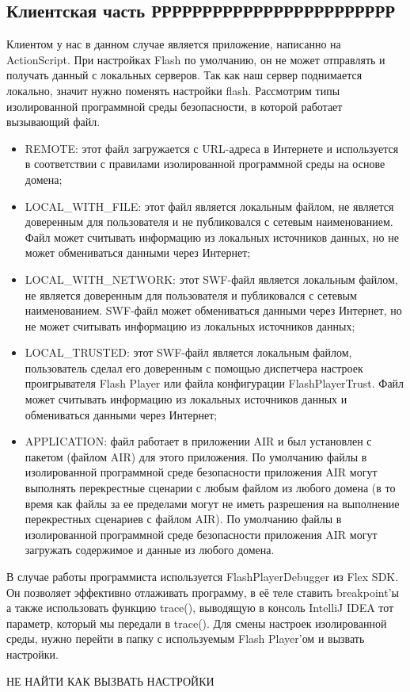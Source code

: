\subsection{Клиентская часть РРРРРРРРРРРРРРРРРРРРРРРР}
Клиентом у нас в данном случае является приложение, написанно на ActionScript. При настройках Flash по умолчанию, он не может отправлять и получать данный с локальных серверов. Так как наш сервер поднимается локально, значит нужно поменять настройки flash. Рассмотрим типы изолированной программной среды безопасности, в которой работает вызывающий файл.
\begin{itemize}
  \item REMOTE: этот файл загружается с URL-адреса в Интернете и используется в соответствии с правилами изолированной программной среды на основе домена;
  \item LOCAL\_WITH\_FILE: этот файл является локальным файлом, не является доверенным для пользователя и не публиковался с сетевым наименованием. Файл может считывать информацию из локальных источников данных, но не может обмениваться данными через Интернет;
  \item LOCAL\_WITH\_NETWORK: этот SWF-файл является локальным файлом, не является доверенным для пользователя и публиковался с сетевым наименованием. SWF-файл может обмениваться данными через Интернет, но не может считывать информацию из локальных источников данных;
  \item LOCAL\_TRUSTED: этот SWF-файл является локальным файлом, пользователь сделал его доверенным с помощью диспетчера настроек проигрывателя Flash Player или файла конфигурации FlashPlayerTrust. Файл может считывать информацию из локальных источников данных и обмениваться данными через Интернет;
  \item APPLICATION: файл работает в приложении AIR и был установлен с пакетом (файлом AIR) для этого приложения. По умолчанию файлы в изолированной программной среде безопасности приложения AIR могут выполнять перекрестные сценарии с любым файлом из любого домена (в то время как файлы за ее пределами могут не иметь разрешения на выполнение перекрестных сценариев с файлом AIR). По умолчанию файлы в изолированной программной среде безопасности приложения AIR могут загружать содержимое и данные из любого домена. 
\end{itemize}

В случае работы программиста используется FlashPlayerDebugger из Flex SDK. Он позволяет эффективно отлаживать программу, в её теле ставить breakpoint'ы а также использовать функцию trace(), выводящую в консоль IntelliJ IDEA тот параметр, который мы передали в trace().
Для смены настроек изолированной среды, нужно перейти в папку с используемым Flash Player'ом и вызвать настройки.

НЕ НАЙТИ КАК ВЫЗВАТЬ НАСТРОЙКИ



